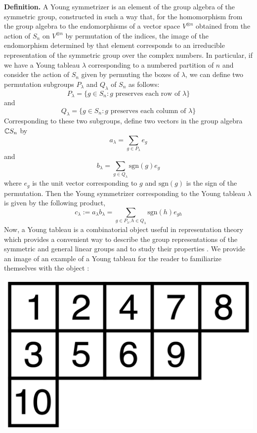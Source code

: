 \documentclass[11pt, a4paper, oneside]{article}
\theoremstyle{plain}
\theoremstyle{definition}
\theoremstyle{example}
\def\sgn{\mathrm{sgn}}
\begin{document}
\par
\textbf{Definition.} A Young symmetrizer is an element of the group algebra of the symmetric group, constructed in such a way that, for the homomorphism from the group algebra to the endomorphisms of a vector space $V^{\otimes n}$ obtained from the action of $S_n$ on $V^{\otimes n}$ by permutation of the indices, the image of the endomorphism determined by that element corresponds to an irreducible representation of the symmetric group over the complex numbers. In particular, if we have a Young tableau $\lambda$ corresponding to a numbered partition of $n$ and consider the action of $S_n$ given by permuting the boxes of $\lambda$, we can define two permutation subgroups $P_{\lambda}$ and $Q_{\lambda}$ of $S_n$ as follows: $$P_{\lambda} = \{g \in S_n: g \text{ preserves each row of } \lambda\}$$ and $$Q_{\lambda} = \{g \in S_n: g \text{ preserves each column of } \lambda\}$$ Corresponding to these two subgroups, define two vectors in the group algebra $\mathbb{C} S_n$ by $$a_{\lambda} = \sum_{g \in P_{\lambda}} e_g$$ and $$b_{\lambda} = \sum_{g \in Q_{\lambda}} \sgn(g) e_g$$ where $e_g$ is the unit vector corresponding to $g$ and $\sgn(g)$ is the sign of the permutation. Then the Young symmetrizer corresponding to the Young tableau $\lambda$ is given by the following product, $$c_{\lambda} := a_{\lambda}b_{\lambda} = \sum_{g \in P_{\lambda}, h \in Q_{\lambda}} \sgn(h) e_{gh}$$ Now, a Young tableau is a combinatorial object useful in representation theory which provides a convenient way to describe the group representations of the symmetric and general linear groups and to study their properties \cite{tableauwiki}. We provide an image of an example of a Young tableau for the reader to familiarize themselves with the object \cite{tableauwiki}:

\includegraphics[scale=0.1]{young_tableau}
\end{document}
